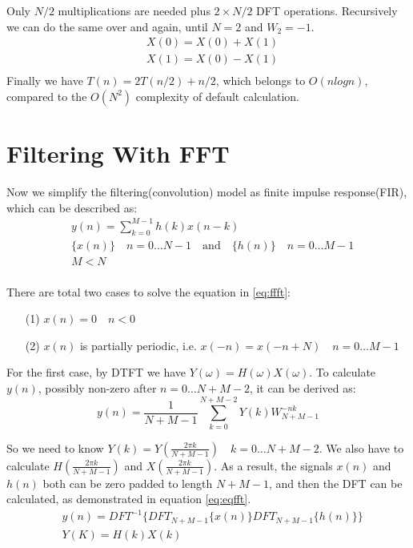 Only $N/2$ multiplications are needed plus $2\times N/2$ DFT operations. 
Recursively we can do the same over and again, until $N=2$ and $W_2=-1$.
\begin{equation}
  \label{eq:down}
  \begin{aligned}
&    X(0) = X(0) + X(1) \\
& X(1) = X(0) - X(1) \\
  \end{aligned}
\end{equation}
Finally we have $T(n) = 2T(n/2) + n/2$, which belongs to $O(nlogn)$, compared to
the $O(N^2)$ complexity of default calculation. 

\section*{Filtering With FFT}

Now we simplify the filtering(convolution) model as finite impulse response(FIR), 
which can be described as:
\begin{equation}
  \label{eq:ffft}
  \begin{aligned}
    & y(n) = \sum_{k=0}^{M-1}h(k)x(n-k)\\
   & \{x(n)\} \quad n= 0 \dots N-1 \quad \text{and} \quad \{h(n)\} \quad n = 0 \dots M-1\\
 & M < N \\
  \end{aligned}
\end{equation}

There are total two cases to solve the equation in \ref{eq:ffft}:
\begin{itemize}
\item[(1)] $x(n) = 0 \quad n<0$
\item[(2)] $x(n)$ is partially periodic, i.e. $x(-n) = x(-n+N) \quad n=0 \dots M-1$
\end{itemize}

For the first case, by DTFT we have $Y(\omega)=H(\omega)X(\omega)$.
To calculate $y(n)$, possibly non-zero after $n=0 \dots N+M-2$, it can 
be derived as:
\begin{equation}
  \label{eq:convfft}
  y(n) = \frac{1}{N+M-1}\sum_{k=0}^{N+M-2}Y(k)W_{N+M-1}^{-nk}
\end{equation}

So we need to know $Y(k) = Y(\frac{2\pi k}{N+M-1}) \quad k = 0 \dots N+M-2$. 
We also have to calculate $H(\frac{2\pi k}{N+M-1})$ and $X(\frac{2\pi k}{N+M-1})$.
As a result, the signals $x(n)$ and $h(n)$ both can be zero padded to length $N+M-1$,
and then the DFT can be calculated, as demonstrated in equation \ref{eq:eqfft}.
\begin{equation}
  \label{eq:eqfft}
  \begin{aligned}
    & y(n) = DFT^{-1}\{ DFT_{N+M-1}\{x(n)\} DFT_{N+M-1}\{h(n)\}  \}\\
  & Y(K) = H(k)X(k)\\
  \end{aligned}
\end{equation}

